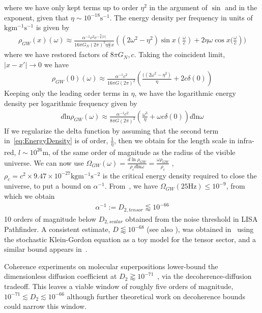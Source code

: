 \documentclass[aps,preprintnumbers,superscriptaddress,longbibliography]{revtex4-1}
\begin{document}
where we have only kept terms up to order $\eta^2$ in the argument of $\sin$ and in the exponent, given that $\eta \sim 10^{-18}\text{s}^{-1}$.
The energy density per frequency in units of $\text{kg}\text{m}^{-1}\text{s}^{-1}$ is given by
\begin{align}
    \mathcal{\rho}_{GW}(x)(\omega)\approx\frac{\alpha^{-1}c^2e^{-\frac{\eta}{c}|x|}}{16\pi G_N(2\pi)^2\eta\frac{\omega}{c} x}((2\omega^2-\eta^2)\sin{x(\frac{\omega}{c})}+2\eta\omega\cos{x(\frac{\omega}{c}}))
\end{align}
where we have restored factors of $8\pi G_N,c$. Taking the coincident limit, $|x-x'|\rightarrow 0$ we have
\begin{align}
\label{eq:EnergyDensity}
\mathcal{\rho}_{GW}(0)(\omega)\approx\frac{\alpha^{-1}c^2}{16\pi G(2\pi)^2}(\frac{((2\omega^2-\eta^2)}{\eta}+2c\delta(0))
\end{align}
Keeping only the leading order terms in $\eta$, we have the logarithmic energy density per logarithmic frequency given by
\begin{align}
\label{eq:tensorintegrated}d\text{ln}\mathcal{\rho}_{GW}(\omega)\approx\frac{\alpha^{-1}c^2}{8\pi G(2\pi)^2}(\frac{\omega^3}{\eta}+\omega c\delta(0))d\text{ln}\omega
\end{align}
If we regularize the delta function by assuming that the second term in~\eqref{eq:EnergyDensity} is of order, $\frac{1}{\eta}$, then we obtain for the length scale in infra-red, $l\sim 10^{26}\text{m}$, of the same order of magnitude as the radius of the visible universe. 
We can now use $\Omega_{GW}(\omega)=\frac{d\ln\rho_{GW}}{\rho_c d \text{ln}\omega}=\frac{\omega\rho_{GW}}{\rho_c}$ , $\rho_c=c^{2}\times 9.47\times 10^{-27}\text{kg}\text{m}^{-1}\text{s}^{-2}$ is the critical energy density required to close the universe, to put a bound on $\alpha^{-1}$. From~\cite{abac2025upper}, we have $\Omega_{GW}(25\text{Hz})\leq 10^{-9}$, from which we obtain
\begin{align}
\label{eq:tensorbound}
\alpha^{-1}:=D_{2,tensor}\lessapprox10^{-66}
\end{align}
10 orders of magnitude below $D_{2,scalar}$ obtained from the noise threshold in LISA Pathfinder. A consistent estimate, $D\lessapprox 10^{-68}$ (see also \cite{penington2024}), was obtained in~\cite{oppenheim2025diffusion} using the stochastic Klein-Gordon equation as a toy model for the tensor sector, and a similar bound appears in~\cite{hirotani2026testing}.

Coherence experiments on molecular superpositions lower-bound the dimensionless diffusion coefficient at $D_2\gtrapprox 10^{-71}$~\cite{oppenheim2025diffusion}, via the decoherence-diffusion tradeoff. This leaves a viable window of roughly five orders of magnitude, $10^{-71}\lesssim D_2 \lesssim 10^{-66}$ although further theoretical work on decoherence bounds could narrow this window.
\end{document}
